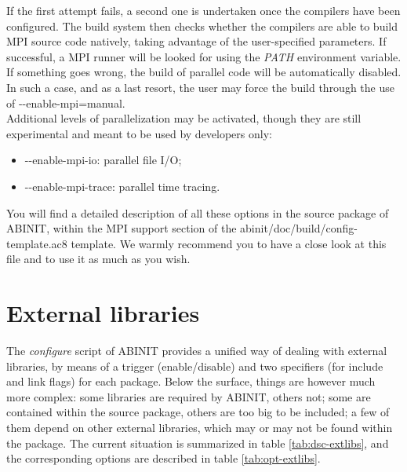 If the first attempt fails, a second one is undertaken once the compilers
have been configured. The build system then checks whether the compilers
are able to build MPI source code natively, taking advantage of the
user-specified parameters. If successful, a MPI runner will be looked
for using the \textit{PATH} environment variable. If something goes
wrong, the build of parallel code will be automatically disabled.
In such a case, and as a last resort, the user may force the build
through the use of \textquotedbl{}-{-}enable-mpi=manual\textquotedbl{}.
\\


Additional levels of parallelization may be activated, though they
are still experimental and meant to be used by developers only: 
\begin{itemize}
\item \textquotedbl{}-{-}enable-mpi-io\textquotedbl{}: parallel file I/O; 
\item \textquotedbl{}-{-}enable-mpi-trace\textquotedbl{}: parallel time
tracing. 
\end{itemize}
You will find a detailed description of all these options in the source
package of ABINIT, within the MPI support section of the \textquotedbl{}{~}abinit/doc/build/config-template.ac8\textquotedbl{}
template. We warmly recommend you to have a close look at this file
and to use it as much as you wish.


\section{External libraries}

The \textit{configure} script of ABINIT provides a unified way of
dealing with external libraries, by means of a trigger (enable/disable)
and two specifiers (for include and link flags) for each package.
Below the surface, things are however much more complex: some libraries
are required by ABINIT, others not; some are contained within the
source package, others are too big to be included; a few of them depend
on other external libraries, which may or may not be found within
the package. The current situation is summarized in table \ref{tab:dsc-extlibs},
and the corresponding options are described in table \ref{tab:opt-extlibs}.
\\


